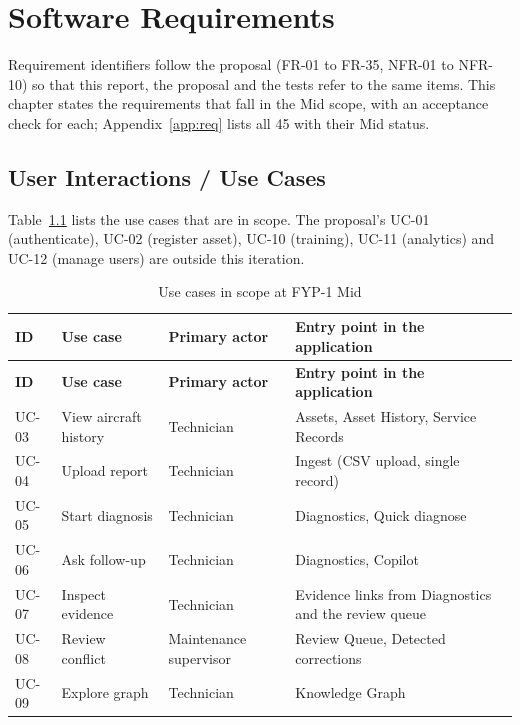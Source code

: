 \chapter{Software Requirements}\label{ch:req}

Requirement identifiers follow the proposal (FR-01 to FR-35, NFR-01 to NFR-10) so that this report, the proposal and the tests refer to the same items. This chapter states the requirements that fall in the Mid scope, with an acceptance check for each; Appendix~\ref{app:req} lists all 45 with their Mid status.

\section{User Interactions / Use Cases}
Table~\ref{tab:uc} lists the use cases that are in scope. The proposal's UC-01 (authenticate), UC-02 (register asset), UC-10 (training), UC-11 (analytics) and UC-12 (manage users) are outside this iteration.

\begin{longtable}{p{}p{}p{}p{}}
\caption{Use cases in scope at FYP-1 Mid}\label{tab:uc}\\
\toprule \textbf{ID} & \textbf{Use case} & \textbf{Primary actor} & \textbf{Entry point in the application} \\ \midrule \endfirsthead
\toprule \textbf{ID} & \textbf{Use case} & \textbf{Primary actor} & \textbf{Entry point in the application} \\ \midrule \endhead
UC-03 & View aircraft history & Technician & Assets, Asset History, Service Records \\
UC-04 & Upload report & Technician & Ingest (CSV upload, single record) \\
UC-05 & Start diagnosis & Technician & Diagnostics, Quick diagnose \\
UC-06 & Ask follow-up & Technician & Diagnostics, Copilot \\
UC-07 & Inspect evidence & Technician & Evidence links from Diagnostics and the review queue \\
UC-08 & Review conflict & Maintenance supervisor & Review Queue, Detected corrections \\
UC-09 & Explore graph & Technician & Knowledge Graph \\
\bottomrule
\end{longtable}

